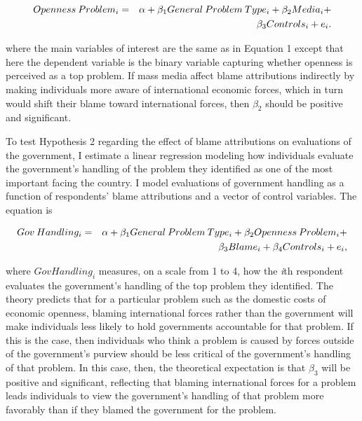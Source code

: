 \documentclass[12pt]{report}
\begin{document}
\begin{eqnarray} Openness\:Problem_{i} & = &
\alpha+\beta_{1}General\:Problem\:Type_{i}+\beta_{2}Media_{i}+ \notag \\ &  &
\beta_{3}Controls_{i}+e_{i}. \end{eqnarray}

where the main variables of interest are the same as in Equation 1 except that here the dependent
variable is the binary variable capturing whether openness is perceived as a top problem. If mass
media affect blame attributions indirectly by making individuals more aware of international
economic forces, which in turn would shift their blame toward international forces, then $\beta_{2}$
should be positive and significant.

To test Hypothesis 2 regarding the effect of blame attributions on evaluations of the government, I
estimate a linear regression modeling how individuals evaluate the government's handling of the
problem they identified as one of the most important facing the country. I model evaluations of
government handling as a function of respondents' blame attributions and a vector of control
variables. The equation is

\begin{eqnarray} Gov\:Handling_{i} & = &
\alpha+\beta_{1}General\:Problem\:Type_{i}+\beta_{2}Openness\:Problem_{i}+ \notag \\ &  &
\beta_{3}Blame_{i} + \beta_{4}Controls_{i}+e_{i}, \end{eqnarray}

\begin{doublespace} \noindent where $ $$GovHandling_{i}$ measures, on a scale from 1 to 4, how the
\emph{i}th respondent evaluates the government's handling of the top problem they identified. The
theory predicts that for a particular problem such as the domestic costs of economic openness,
blaming international forces rather than the government will make individuals less likely to hold
governments accountable for that problem. If this is the case, then individuals who think a problem
is caused by forces outside of the government's purview should be less critical of the government's
handling of that problem. In this case, then, the theoretical expectation is that $ $$\beta_{3}$
will be positive and significant, reflecting that blaming international forces for a problem leads
individuals to view the government's handling of that problem more favorably than if they blamed the
government for the problem. \end{doublespace}
\end{document}
